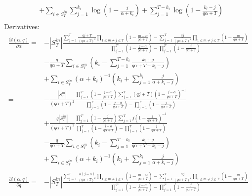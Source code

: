 \documentclass[a4paper, 12pt]{article}
\begin{document}
\begin{itemize}
\begin{align}
        &+ \sum_{i \in S_T^{in}}\sum_{j = 1}^{k_i} \log(1 - \frac{j}{\alpha + k_i}) + \sum_{j = 1}^{T - k_i} \log(1 - \frac{k_i - j}{q\alpha + T}) \nonumber \\
    \end{align}
    Derivatives:
    \begin{align} \label{eq:6}
        \frac{\partial l(\alpha, q)}{\partial \alpha} =& -|S_T^{in}| \frac{\sum_{j = 1}^{T} \frac{qj + T}{(q\alpha + T)^2}\prod_{1 \leq m \neq j \leq T} (1 - \frac{m - \alpha}{q\alpha + T}) - \sum_{j = 1}^{T} \frac{qj}{(q\alpha + T)^2} \prod_{1 \leq m \neq j \leq T} (1 - \frac{m}{q\alpha + T})}{\prod_{j=1}^T (1 - \frac{j - \alpha}{q\alpha + T}) - \prod_{j=1}^T (1 - \frac{j}{q\alpha + T})}\nonumber \\
        &- \frac{q}{q\alpha + T} \sum_{i \in S_T^{in}} \left( k_i - \sum_{j = 1}^{T - k_i} \frac{k_i + j}{q\alpha + T - k_i - j} \right) \nonumber \\
        &+ \sum_{i \in S_T^{in}} (\alpha + k_i)^{-1}\left(k_i + \sum_{j = 1}^{k_i} \frac{j}{\alpha + k_i - j}\right) \nonumber \\
        =& - \frac{|S_T^{in}|}{(q\alpha + T)^2} \frac{\prod_{j = 1}^{T} (1 - \frac{j - \alpha}{q\alpha + T}) \sum_{j = 1}^{T} (qj + T) (1 - \frac{j - \alpha}{q\alpha + T})^{-1} }{ \prod_{j=1}^T (1 - \frac{j - \alpha}{q\alpha + T}) - \prod_{j=1}^T (1 - \frac{j}{q\alpha + T})} \nonumber \\
        &+ \frac{q|S_T^{in}|}{(q\alpha + T)^2} \frac{ \prod_{j = 1}^{T} (1 - \frac{j}{q\alpha + T})\sum_{j = 1}^{T} j(1 - \frac{j}{q\alpha + T})^{-1} }{ \prod_{j=1}^T (1 - \frac{j - \alpha}{q\alpha + T}) - \prod_{j=1}^T (1 - \frac{j}{q\alpha + T})} \nonumber \\
        &- \frac{q}{q\alpha + T} \sum_{i \in S_T^{in}} \left( k_i - \sum_{j = 1}^{T - k_i} \frac{k_i + j}{q\alpha + T - k_i - j} \right) \nonumber \\
        &+ \sum_{i \in S_T^{in}} (\alpha + k_i)^{-1}\left(k_i + \sum_{j = 1}^{k_i} \frac{j}{\alpha + k_i - j}\right) \nonumber \\
    \end{align}
    \begin{align}
        \frac{\partial l(\alpha, q)}{\partial q} =& -|S_T^{in}| \frac{\sum_{j = 1}^T \frac{\alpha(j - \alpha)}{(q\alpha + T)^2} \prod_{1 \leq m \neq j \leq T} (1 - \frac{m - \alpha}{q\alpha + T}) - \sum_{j = 1}^{T} \frac{\alpha j}{(q\alpha + T)^2}\prod_{1 \leq m \neq j \leq T} (1 - \frac{m}{q\alpha + T})}{\prod_{j=1}^T (1 - \frac{j - \alpha}{q\alpha + T}) - \prod_{j=1}^T (1 - \frac{j}{q\alpha + T})}\nonumber \\

\end{align}
\end{itemize}
\end{document}

